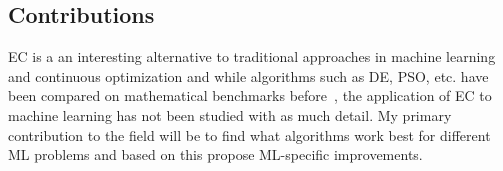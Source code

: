 \subsection{Contributions}

EC is a an interesting alternative to traditional approaches in machine learning and continuous optimization and while algorithms such as DE, PSO, etc. have been compared on mathematical benchmarks before~\cite{vesterstrom2004comparative, price1997differential}, the application of EC to machine learning has not been studied with as much detail. My primary contribution to the field will be to find what algorithms work best for different ML problems and based on this propose ML-specific improvements.

